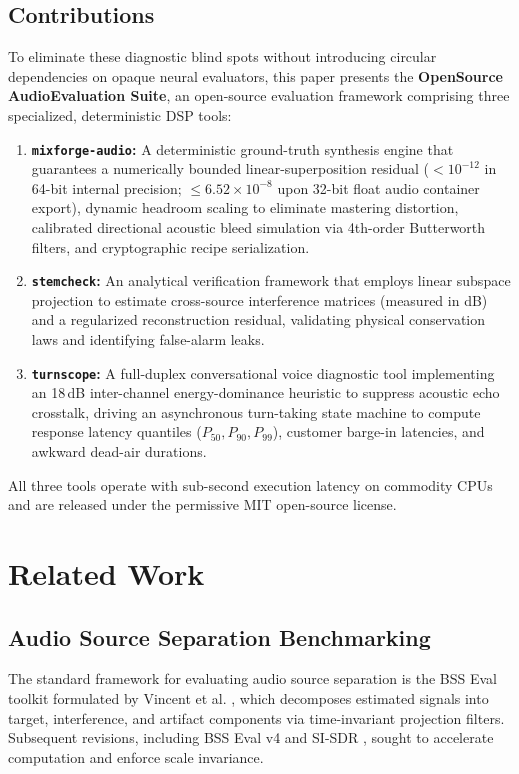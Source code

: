 \documentclass[10pt,journal,compsoc]{IEEEtran}
\begin{document}
\subsection{Contributions}
To eliminate these diagnostic blind spots without introducing circular dependencies on opaque neural evaluators, this paper presents the \textbf{OpenSource AudioEvaluation Suite}, an open-source evaluation framework comprising three specialized, deterministic DSP tools:
\begin{enumerate}
    \item \textbf{\texttt{mixforge-audio}:} A deterministic ground-truth synthesis engine that guarantees a numerically bounded linear-superposition residual ($< 10^{-12}$ in 64-bit internal precision; $\le 6.52 \times 10^{-8}$ upon 32-bit float audio container export), dynamic headroom scaling to eliminate mastering distortion, calibrated directional acoustic bleed simulation via 4th-order Butterworth filters, and cryptographic recipe serialization.
    \item \textbf{\texttt{stemcheck}:} An analytical verification framework that employs linear subspace projection to estimate cross-source interference matrices (measured in dB) and a regularized reconstruction residual, validating physical conservation laws and identifying false-alarm leaks.
    \item \textbf{\texttt{turnscope}:} A full-duplex conversational voice diagnostic tool implementing an 18\,dB inter-channel energy-dominance heuristic to suppress acoustic echo crosstalk, driving an asynchronous turn-taking state machine to compute response latency quantiles ($P_{50}, P_{90}, P_{99}$), customer barge-in latencies, and awkward dead-air durations.
\end{enumerate}

All three tools operate with sub-second execution latency on commodity CPUs and are released under the permissive MIT open-source license.

\section{Related Work}

\subsection{Audio Source Separation Benchmarking}
The standard framework for evaluating audio source separation is the BSS Eval toolkit formulated by Vincent et al. \cite{vincent2006performance}, which decomposes estimated signals into target, interference, and artifact components via time-invariant projection filters. Subsequent revisions, including BSS Eval v4 \cite{stoter20182018} and SI-SDR \cite{leroux2019sdr}, sought to accelerate computation and enforce scale invariance. 
\end{document}
